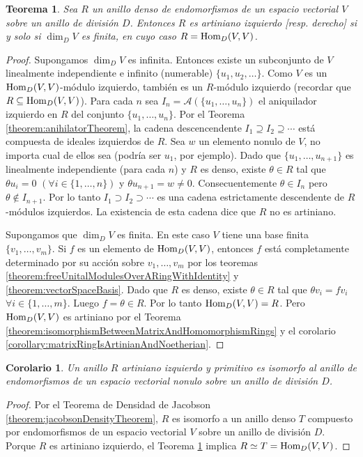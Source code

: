 \documentclass{report}
\newcommand{\Hom}{\textnormal{Hom}}
\newtheorem{theorem}{Teorema}
\newtheorem{corollary}{Corolario}
\begin{document}
  \begin{theorem}\label{theorem:leftArtinianDenseEndomorphismRingsOfVectorSpaces}
    Sea \(R\) un anillo denso de endomorfismos de un espacio vectorial \(V\) sobre un anillo de división \(D\).
    Entonces \(R\) es artiniano izquierdo [resp. derecho] si y solo si \(\dim_D V\) es finita, en cuyo caso \(R = \Hom_D(V, V)\).
  \end{theorem}
  \begin{proof}
    Supongamos \(\dim_D V\) es infinita.
    Entonces existe un subconjunto de \(V\) linealmente independiente e infinito (numerable) \(\{u_1, u_2, \dots\}\).
    Como \(V\) es un \(\Hom_D(V, V)\)-módulo izquierdo, también es un \(R\)-módulo izquierdo (recordar que \(R \subseteq \Hom_D(V, V)\)).
    Para cada \(n\) sea \(I_n = \mathcal{A}(\{u_1, \dots, u_n\})\) el aniquilador izquierdo en \(R\) del conjunto \(\{u_1, \dots, u_n\}\).
    Por el Teorema \ref{theorem:anihilatorTheorem}, la cadena descencendente \(I_1 \supseteq I_2 \supseteq \cdots\) está compuesta de ideales izquierdos de \(R\).
    Sea \(w\) un elemento nonulo de \(V\), no importa cual de ellos sea (podría ser \(u_1\), por ejemplo).
    Dado que \(\{u_1, \dots, u_{n + 1}\}\) es linealmente independiente (para cada \(n\)) y \(R\) es denso, existe \(\theta \in R\) tal que \(\theta u_i = 0\) \((\forall i \in \{1, \dots, n\})\) y \(\theta u_{n + 1} = w \neq 0\).
    Consecuentemente \(\theta \in I_n\) pero \(\theta \notin I_{n + 1}\).
    Por lo tanto \(I_1 \supset I_2 \supset \cdots\) es una cadena estrictamente descendente de \(R\)-módulos izquierdos.
    La existencia de esta cadena dice que \(R\) no es artiniano.

    Supongamos que \(\dim_D V\) es finita.
    En este caso \(V\) tiene una base finita \(\{v_1, \dots, v_m\}\).
    Si \(f\) es un elemento de \(\Hom_D(V, V)\), entonces \(f\) está completamente determinado por su acción sobre \(v_1, \dots, v_m\) por los teoremas \ref{theorem:freeUnitalModulesOverARingWithIdentity} y \ref{theorem:vectorSpaceBasis}.
    Dado que \(R\) es denso, existe \(\theta \in R\) tal que \(\theta v_i = f v_i\) \(\forall i \in \{1, \dots, m\}\).
    Luego \(f = \theta \in R\).
    Por lo tanto \(\Hom_D(V, V) = R\).
    Pero \(\Hom_D(V, V)\) es artiniano por el Teorema \ref{theorem:isomorphismBetweenMatrixAndHomomorphismRings} y el corolario \ref{corollary:matrixRingIsArtinianAndNoetherian}.
  \end{proof}

  \begin{corollary}\label{corollary:leftArtinianPrimitiveRingsAreRingsOfEndomorphisms}
    Un anillo \(R\) artiniano izquierdo y primitivo es isomorfo al anillo de endomorfismos de un espacio vectorial nonulo sobre un anillo de división \(D\).
  \end{corollary}
  \begin{proof}
    Por el Teorema de Densidad de Jacobson \ref{theorem:jacobsonDensityTheorem}, \(R\) es isomorfo a un anillo denso \(T\) compuesto por endomorfismos de un espacio vectorial \(V\) sobre un anillo de división \(D\).
    Porque \(R\) es artiniano izquierdo, el Teorema \ref{theorem:leftArtinianDenseEndomorphismRingsOfVectorSpaces} implica \(R \simeq T = \Hom _D(V, V)\).
  \end{proof}
\end{document}

